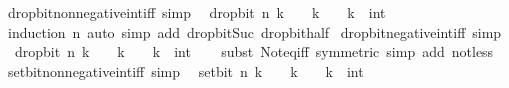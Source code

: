 \begin{isabellebody}
\endisatagproof
{\isafoldproof}%
%
\isadelimproof
\isanewline
%
\endisadelimproof
\isanewline
{}\isamarkupfalse%
\ drop{\isacharunderscore}{\kern0pt}bit{\isacharunderscore}{\kern0pt}nonnegative{\isacharunderscore}{\kern0pt}int{\isacharunderscore}{\kern0pt}iff\ {\isacharbrackleft}{\kern0pt}simp{\isacharbrackright}{\kern0pt}{\isacharcolon}{\kern0pt}\isanewline
\ \ {\isacartoucheopen}drop{\isacharunderscore}{\kern0pt}bit\ n\ k\ {\isasymge}\ {}\ {\isasymlongleftrightarrow}\ k\ {\isasymge}\ {}{\isacartoucheclose}\ \ k\ {\isacharcolon}{\kern0pt}{\isacharcolon}{\kern0pt}\ int\isanewline
%
\isadelimproof
\ \ %
\endisadelimproof
%
\isatagproof
{}\isamarkupfalse%
\ {\isacharparenleft}{\kern0pt}induction\ n{\isacharparenright}{\kern0pt}\ {\isacharparenleft}{\kern0pt}auto\ simp\ add{\isacharcolon}{\kern0pt}\ drop{\isacharunderscore}{\kern0pt}bit{\isacharunderscore}{\kern0pt}Suc\ drop{\isacharunderscore}{\kern0pt}bit{\isacharunderscore}{\kern0pt}half{\isacharparenright}{\kern0pt}%
\endisatagproof
{\isafoldproof}%
%
\isadelimproof
\isanewline
%
\endisadelimproof
\isanewline
{}\isamarkupfalse%
\ drop{\isacharunderscore}{\kern0pt}bit{\isacharunderscore}{\kern0pt}negative{\isacharunderscore}{\kern0pt}int{\isacharunderscore}{\kern0pt}iff\ {\isacharbrackleft}{\kern0pt}simp{\isacharbrackright}{\kern0pt}{\isacharcolon}{\kern0pt}\isanewline
\ \ {\isacartoucheopen}drop{\isacharunderscore}{\kern0pt}bit\ n\ k\ {\isacharless}{\kern0pt}\ {}\ {\isasymlongleftrightarrow}\ k\ {\isacharless}{\kern0pt}\ {}{\isacartoucheclose}\ \ k\ {\isacharcolon}{\kern0pt}{\isacharcolon}{\kern0pt}\ int\isanewline
%
\isadelimproof
\ \ %
\endisadelimproof
%
\isatagproof
{}\isamarkupfalse%
\ {\isacharparenleft}{\kern0pt}subst\ Not{\isacharunderscore}{\kern0pt}eq{\isacharunderscore}{\kern0pt}iff\ {\isacharbrackleft}{\kern0pt}symmetric{\isacharbrackright}{\kern0pt}{\isacharparenright}{\kern0pt}\ {\isacharparenleft}{\kern0pt}simp\ add{\isacharcolon}{\kern0pt}\ not{\isacharunderscore}{\kern0pt}less{\isacharparenright}{\kern0pt}%
\endisatagproof
{\isafoldproof}%
%
\isadelimproof
\isanewline
%
\endisadelimproof
\isanewline
{}\isamarkupfalse%
\ set{\isacharunderscore}{\kern0pt}bit{\isacharunderscore}{\kern0pt}nonnegative{\isacharunderscore}{\kern0pt}int{\isacharunderscore}{\kern0pt}iff\ {\isacharbrackleft}{\kern0pt}simp{\isacharbrackright}{\kern0pt}{\isacharcolon}{\kern0pt}\isanewline
\ \ {\isacartoucheopen}set{\isacharunderscore}{\kern0pt}bit\ n\ k\ {\isasymge}\ {}\ {\isasymlongleftrightarrow}\ k\ {\isasymge}\ {}{\isacartoucheclose}\ \ k\ {\isacharcolon}{\kern0pt}{\isacharcolon}{\kern0pt}\ int\isanewline

\end{isabellebody}
